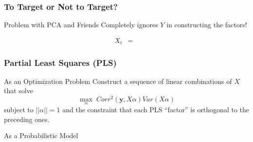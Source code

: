 \documentclass[handout]{beamer}
\begin{document}
\begin{frame}[c]\frametitle{To Target or Not to Target?}
    
    \begin{block}
    	{Problem with PCA and Friends}
    	Completely ignores $Y$ in constructing the factors!    
	\end{block}

\begin{eqnarray*}
	X_t &=& 
\end{eqnarray*}

\end{frame}

\begin{frame}[c]\frametitle{Partial Least Squares (PLS)}

\begin{block}
	{As an Optimization Problem}
	Construct a sequence of linear combinations of $X$ that solve
	$$\underset{\alpha}{\max} \; Corr^2(\textbf{y}, X\alpha)Var(X\alpha)$$
subject to $||\alpha ||=1$ and the constraint that each PLS ``factor'' is orthogonal to the preceding ones.
\end{block}

\begin{block}
	{As a Probabilistic Model}
	\begin{eqnarray*}
		
	\end{eqnarray*}
\end{block}

\end{frame}

\end{document}
